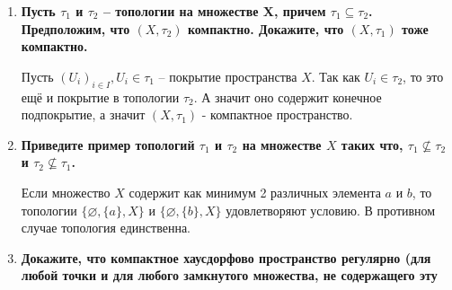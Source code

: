 \documentclass{article}
\begin{document}
\begin{enumerate}
{        если если $X=X'$, то отображение $(f,g):x\mapsto(f(x), g(x))$ тоже
        непрерывно.}\par
        \textbf{Доказательство:} Пусть $U\subseteq Y\times Y'$ открытое
        множество, тогда $U=\bigcup_i V_i\times V_i'$, где $V_i$ и $V_i'$
        открытые множества соответственных топологических пространств. Это
        значит, что $(f\times g)^{-1}[U]=\bigcup_i f^{-1} [V_i]\times g^{-1}
        [V_i']$, что является объединением произведений отрытых множеств, а
        значит открыто и $(f\times g)$ непрерывно. Теперь пусть $X=X'$. Тогда
        $(f,g)^{-1}[U]=\bigcup_i f^{-1} [V_i]\cap g^{-1}[V_i']$ – очевидно
        открыто. А значит прообраз открытого при $(f, g)$ всегда открыт,
        значит $(f, g)$ непрерывно.\par

        Заметим, что $C = (f, g)^{-1}[\Delta]$ прообраз замкнутого множества
        при непрерывном отображении, а значит само $C$ замкнуто.\par
        \textbf{Докажите, что если $f:X\longrightarrow X$ – непрерывное
        отображение хаусдорфова пространства $X$ на себя, то множество
        неподвижных точек $C=\{x\in X|f(x)=x\}$ замкнуто в $X$.}\par
        Здесь $g=\text{id}_x$ – непрерывно, а значит по предыдущему заданию $C$
        замкнуто.
    \item \textbf{Пусть $\tau_1$ и $\tau_2$ – топологии на множестве X, причем
        $\tau_1\subseteq \tau_2$. Предположим, что $(X, \tau_2)$ компактно.
        Докажите, что $(X, \tau_1)$ тоже компактно.}\par
        Пусть $(U_i)_{i\in I}, U_i \in \tau_1$ – покрытие пространства  $X$.
        Так как $U_i\in\tau_2$, то это ещё и покрытие в топологии $\tau_2$. А
        значит оно содержит конечное подпокрытие, а значит $(X, \tau_1)$ -
        компактное пространство.
    \item \textbf{Приведите пример топологий $\tau_1$ и $\tau_2$ на множестве
        $X$ таких что, $\tau_1\nsubseteq\tau_2$ и $\tau_2\nsubseteq\tau_1$.}\par
        Если множество $X$ содержит как минимум 2 различных элемента $a$ и $b$,
        то топологии $\{\varnothing, \{a\}, X\}$ и $\{\varnothing, \{b\}, X\}$
        удовлетворяют условию. В противном случае топология единственна.
    \item \textbf{Докажите, что компактное хаусдорфово пространство регулярно
        (для любой точки и для любого замкнутого множества, не содержащего эту
}
\end{enumerate}
\end{document}

